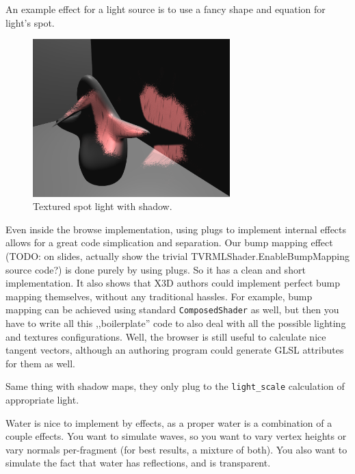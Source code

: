 \documentclass{acmsiggraph}                     %
\begin{document}
An example effect for a light source is to use a fancy shape and equation
for light's spot.

\begin{figure}[H]
  \centering
  \includegraphics[width=3in]{fancy_light_spot_shape}
  \caption{Textured spot light with shadow.}
\end{figure}

Even inside the browse implementation, using plugs to implement internal
effects allows for a great code simplication and separation.
Our bump mapping effect (TODO: on slides, actually show
the trivial TVRMLShader.EnableBumpMapping source code?)
is done purely by using plugs.
So it has a clean and short implementation. It also shows that
X3D authors could implement perfect bump mapping themselves,
without any traditional hassles. For example, bump mapping can be
achieved using standard \texttt{ComposedShader} as well,
but then you have to write all this ,,boilerplate'' code to also deal
with all the possible lighting and textures configurations.
Well, the browser is still useful to calculate nice tangent vectors,
although an authoring program could generate GLSL attributes for them as well.

Same thing with shadow maps, they only plug to the \texttt{light\_scale}
calculation of appropriate light.

Water is nice to implement by effects, as a proper water is a combination
of a couple effects. You want to simulate waves, so you want to vary vertex
heights or vary normals per-fragment (for best results, a mixture of both).
You also want to simulate the fact that water has reflections, and
is transparent.
\end{document}
